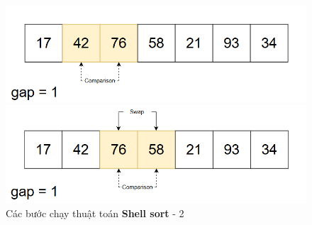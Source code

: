 \begin{figure}[H]
    \includegraphics[width=0.5\linewidth]{img/shell_sort/8.png}
    \vspace{0.15cm}

    \includegraphics[width=0.5\linewidth]{img/shell_sort/09.png}
    \caption{Các bước chạy thuật toán \textbf{Shell sort} - 2}
\end{figure}


